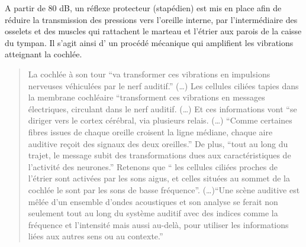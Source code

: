 A partir de 80 dB, un réflexe protecteur (stapédien) est mis en place
afin de réduire la transmission des pressions vers l\textquoteright oreille
interne, par l\textquoteright intermédiaire des osselets et des muscles
qui rattachent le marteau et l\textquoteright étrier aux parois de
la caisse du tympan. Il s'agit ainsi d' un procédé mécanique qui amplifient
les vibrations atteignant la cochlée. 
\begin{quotation}
	La cochlée à son tour ``va transformer ces vibrations en impulsions
	nerveuses véhiculées par le nerf auditif.'' (\dots) Les cellules ciliées
	tapies dans la membrane cochléaire ``transforment ces vibrations
	en messages électriques, circulant dans le nerf auditif. (\dots) Et
	ces informations vont ``se diriger vers le cortex cérébral, via plusieurs
	relais. (\dots) ``Comme certaines fibres issues de chaque oreille croisent
	la ligne médiane, chaque aire auditive reçoit des signaux des deux
	oreilles.'' De plus, ``tout au long du trajet, le message subit
	des transformations dues aux caractéristiques de l'activité des neurones.''
	Retenons que `` les cellules ciliées proches de l'étrier sont activées
	par les sons aigus, et celles situées au sommet de la cochlée le sont
	par les sons de basse fréquence''. (\dots)``Une scène auditive est
	mêlée d'un ensemble d'ondes acoustiques et son analyse se ferait non
	seulement tout au long du système auditif avec des indices comme la
	fréquence et l'intensité mais aussi au-delà, pour utiliser les informations
	liées aux autres sens ou au contexte.'' \autocite[chap.1, pp.~15--16]{bigand:cerveau}
\end{quotation}


